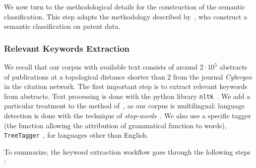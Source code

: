 We now turn to the methodological details for the construction of the semantic classification. This step adapts the methodology described by~\cite{bergeaud2017classifying}, who construct a semantic classification on patent data.

\subsubsection*{Relevant Keywords Extraction}

We recall that our corpus with available text consists of around $2\cdot 10^5$ abstracts of publications at a topological distance shorter than 2 from the journal \textit{Cybergeo} in the citation network. The first important step is to extract relevant keywords from abstracts. Text processing is done with the python library \texttt{nltk}~\citep{bird2006nltk}. We add a particular treatment to the method of~\cite{bergeaud2017classifying}, as our corpus is multilingual: language detection is done with the technique of \emph{stop-words}~\citep{baldwin2010language}. We also use a specific tagger (the function allowing the attribution of grammatical function to words), \texttt{TreeTagger}~\citep{schmid1994probabilistic}, for languages other than English.


To summarize, the keyword extraction workflow goes through the following steps :

